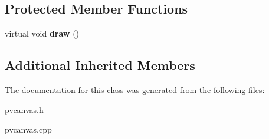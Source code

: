 \subsection*{Protected Member Functions}
\begin{DoxyCompactItemize}
\item 
\hypertarget{class_tetris_1_1_p_v_canvas_a21a1d93c93abf96fdcf8421896663c6a}{virtual void {\bfseries draw} ()}\label{class_tetris_1_1_p_v_canvas_a21a1d93c93abf96fdcf8421896663c6a}

\end{DoxyCompactItemize}
\subsection*{Additional Inherited Members}


The documentation for this class was generated from the following files\-:\begin{DoxyCompactItemize}
\item 
pvcanvas.\-h\item 
pvcanvas.\-cpp\end{DoxyCompactItemize}
